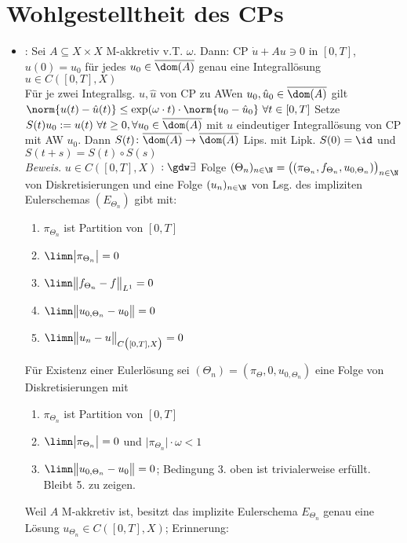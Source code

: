 	\section{Wohlgestelltheit des CPs}
	\begin{itemize}
		\item {}: Sei $A\subseteq X\times X$ M-akkretiv v.T. $\omega$.
		Dann: CP $\dot{u}+Au\ni 0$ in $[0,T]$, $u(0)=u_0$ für jedes $u_0\in\overline{\dom(A)}$ genau eine Integrallösung $u\in C([0,T],X)$\\
		Für je zwei Integrallsg. $u,\hat{u}$ von CP zu AWen $u_0,\hat{u}_0\in\overline{\dom(A)}$ gilt
		$\norm{u(t)-\hat{u}(t)}\leq\exp(\omega\cdot t)\cdot\norm{u_0-\hat{u}_0}~\forall t\in[0,T]$
		Setze $S(t)u_0:=u(t)~\forall t\geq0,\forall u_0\in\overline{\dom(A)}$ mit $u$ eindeutiger Integrallösung von CP mit AW $u_0$.
		Dann $S(t)\colon\overline{\dom(A)}\to\overline{\dom(A)}$ Lips. mit Lipk. $S(0)=\id$ und $S(t+s)=S(t)\circ S(s)$\\
		\textit{Beweis.}
		$u\in C([0,T],X)$  $:\gdw\exists$ Folge $(\Theta_n)_{n\in\N}=\big((\pi_{\Theta_n},f_{\Theta_n},u_{0,\Theta_n})\big)_{n\in\N}$ von Diskretisierungen und eine Folge $(u_n)_{n\in\N}$ von Lsg. des impliziten Eulerschemas $(E_{\Theta_n})$ gibt mit:
		\begin{enumerate}
			\item $\pi_{\Theta_n}$ ist Partition von $[0,T]$
			\item $\limn\big|\pi_{\Theta_n}\big|=0$
			\item $\limn\big\Vert f_{\Theta_n}-f\big\Vert_{L^1}=0$
			\item $\limn\big\Vert u_{0,\Theta_n}-u_0\big\Vert=0$
			\item $\limn\big\Vert u_n-u\big\Vert_{C\big([0,T],X\big)}=0$
		\end{enumerate}	
		Für Existenz einer Eulerlösung sei $(\Theta_n)=(\pi_\Theta,0,u_{0,\Theta_n})$ eine Folge von Diskretisierungen mit 
		\begin{enumerate}
			\item $\pi_{\Theta_n}$ ist Partition von $[0,T]$
			\item $\limn\big|\pi_{\Theta_n}\big|=0$ und $\big|\pi_{\Theta_n}\big|\cdot\omega<1$
			\item $\limn\big\Vert u_{0,\Theta_n}-u_0\big\Vert=0$; Bedingung 3. oben ist trivialerweise erfüllt. Bleibt 5. zu zeigen.
		\end{enumerate}	
		Weil $A$ M-akkretiv ist, besitzt das implizite Eulerschema $E_{\Theta_n}$ genau eine Lösung $u_{\Theta_n}\in C([0,T],X)$; Erinnerung:

\end{itemize}
